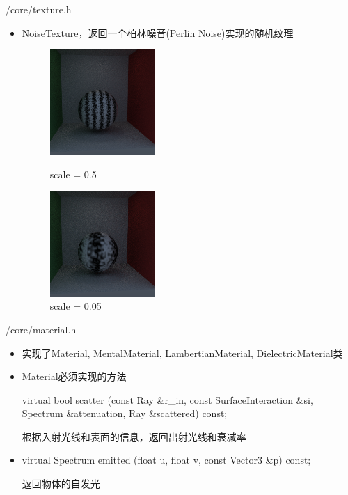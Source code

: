 \documentclass{beamer}
\begin{document}
\begin{frame} {/core/texture.h}
\begin{itemize}
\item NoiseTexture，返回一个柏林噪音(Perlin Noise)实现的随机纹理
\begin{figure}[htbp]
\centering
\begin{minipage}[t]{0.4\textwidth}
\centering
\includegraphics[width=4cm]{noise2}
\caption{scale = 0.5}
\end{minipage}
\begin{minipage}[t]{0.4\textwidth}
\centering
\includegraphics[width=4cm]{noise3}
\caption{scale = 0.05}
\end{minipage}
\end{figure}
\end{itemize}
\end{frame}

\begin{frame} {/core/material.h}
\begin{itemize}
\item 实现了Material, MentalMaterial, LambertianMaterial, DielectricMaterial类
\item Material必须实现的方法
\begin{semiverbatim} \small virtual bool scatter \newline (const Ray \&r\_in, const SurfaceInteraction \&si, Spectrum \&attenuation, Ray \&scattered) const; \end{semiverbatim}
根据入射光线和表面的信息，返回出射光线和衰减率
\item 
\begin{semiverbatim} \small virtual Spectrum emitted \newline (float u, float v, const Vector3 \&p) const; \end{semiverbatim}
返回物体的自发光
\end{itemize}
\end{frame}
\end{document}
